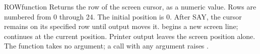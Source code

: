 \begin{XbaseEntry}{ROW}{function}
Returns the row of the screen cursor, as a numeric value.
\Syntax
{}
\Usage
Rows are numbered from 0 through 24.  The initial position is 0.  After
 SAY, the cursor remains on its specified row until output moves it.
 begins a new screen line;  continues at the current position.
Printer output leaves the screen position alone.
The function takes no argument; a call with any argument raises
.
\Examples
{}
\end{XbaseEntry}
